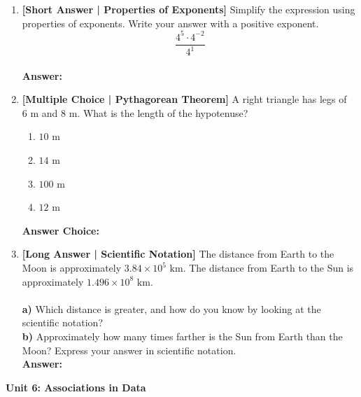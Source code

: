 \documentclass[12pt, letterpaper, fleqn]{article}
\newcommand{\blankshorter}{\underline{\hspace{2.0cm}}}
\newcommand{\blanklong}{\underline{\hspace{6.5cm}}}
\begin{document}
\begin{enumerate}[leftmargin=0.6cm, itemsep=\fill, start=9]

\item \textbf{[Short Answer | Properties of Exponents]} Simplify the expression using properties of exponents. Write your answer with a positive exponent.
$$ \frac{4^5 \cdot 4^{-2}}{4^1} $$
\vspace{1.5cm} \\
\textbf{Answer:} \blanklong

\item \textbf{[Multiple Choice | Pythagorean Theorem]} A right triangle has legs of $6\text{ m}$ and $8\text{ m}$. What is the length of the hypotenuse?
\begin{enumerate}[label=\Alph*)]
    \item $10\text{ m}$
    \item $14\text{ m}$
    \item $100\text{ m}$
    \item $12\text{ m}$
\end{enumerate}
\textbf{Answer Choice:} \blankshorter

\item \textbf{[Long Answer | Scientific Notation]} The distance from Earth to the Moon is approximately $3.84 \times 10^5\text{ km}$. The distance from Earth to the Sun is approximately $1.496 \times 10^8\text{ km}$.
\\ \\
\textbf{a)} Which distance is greater, and how do you know by looking at the scientific notation?
\vspace{1.5cm} \\
\textbf{b)} Approximately how many times farther is the Sun from Earth than the Moon? Express your answer in scientific notation.
\vspace{2.5cm} \\
\textbf{Answer:} \blanklong

\end{enumerate}

\vspace{0.5cm}

\begin{tcolorbox}[colback=teal!5, colframe=teal!60!black, arc=2mm]
    \textbf{Unit 6: Associations in Data}
\end{tcolorbox}
\end{document}
